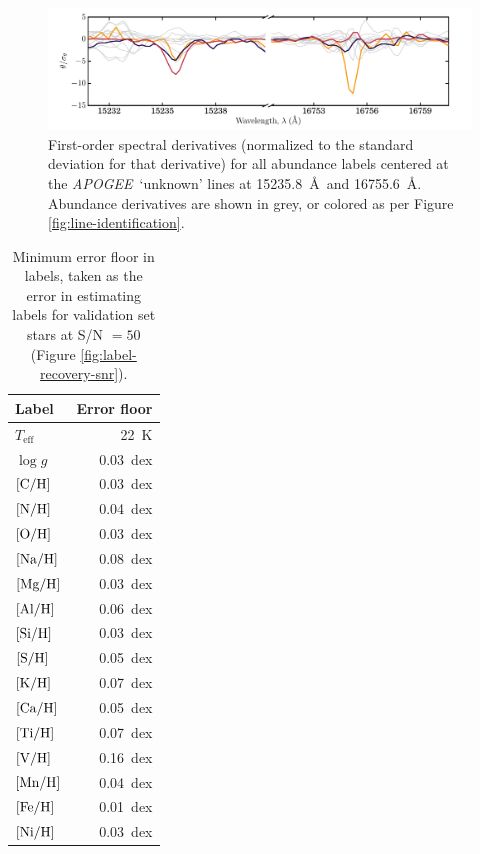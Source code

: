 \documentclass[12pt,preprint]{aastex6}
\newcommand{\project}[1]{\textsl{#1}}
\newcommand{\acronym}[1]{{\small{#1}}}
\newcommand{\apogee}{\project{\acronym{APOGEE}}}
\newcommand{\logg}{\log g}
\newcommand{\Teff}{T_{\mathrm{eff}}}
\begin{document}
\clearpage

\begin{figure}[p]
\centering
\includegraphics[width=\textwidth]{line-identification-zoom.pdf}
\caption{First-order spectral derivatives (normalized to the standard deviation for that derivative) for all abundance labels centered at the \apogee\ `unknown' lines at 15235.8~\AA\ and 16755.6~\AA. Abundance derivatives are shown in grey, or colored as per Figure \ref{fig:line-identification}.\label{fig:line-identification-2}}
\end{figure}

\clearpage

\begin{table}
\centering
\begin{tabular}{lr}
\hline
Label & Error floor \\
\hline
$\Teff$ 		& 22~K \\
$\logg$ 		& 0.03~dex \\
$[\rm{C/H}]$ 	& 0.03~dex \\
$[\rm{N/H}]$  	& 0.04~dex \\
$[\rm{O/H}]$  	& 0.03~dex \\
$[\rm{Na/H}]$ 	& 0.08~dex \\
$[\rm{Mg/H}]$ 	& 0.03~dex \\
$[\rm{Al/H}]$ 	& 0.06~dex \\
$[\rm{Si/H}]$ 	& 0.03~dex \\
$[\rm{S/H}]$	& 0.05~dex \\
$[\rm{K/H}]$ 	& 0.07~dex \\
$[\rm{Ca/H}]$ 	& 0.05~dex \\
$[\rm{Ti/H}]$ 	& 0.07~dex \\
$[\rm{V/H}]$ 	& 0.16~dex \\
$[\rm{Mn/H}]$ 	& 0.04~dex \\
$[\rm{Fe/H}]$ 	& 0.01~dex \\
$[\rm{Ni/H}]$ 	& 0.03~dex \\
\hline
\end{tabular}
\caption{Minimum error floor in labels, taken as the error in estimating labels for validation set stars at S/N $= 50$ (Figure \ref{fig:label-recovery-snr}).}
\label{tab:error-floors}
\end{table}
\end{document}
